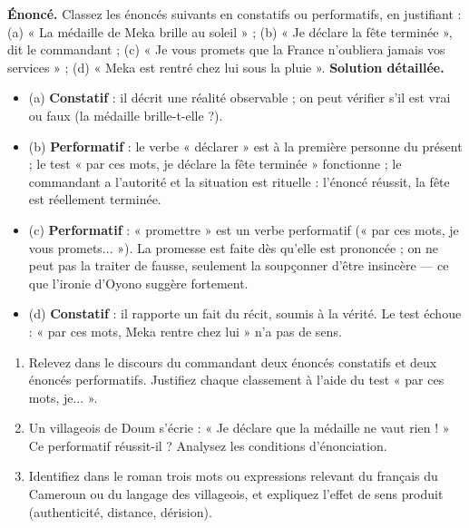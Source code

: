 \documentclass[11pt]{article}
\begin{document}
\begin{exoresolu}
\textbf{Énoncé.} Classez les énoncés suivants en constatifs ou performatifs, en justifiant : (a) « La médaille de Meka brille au soleil » ; (b) « Je déclare la fête terminée », dit le commandant ; (c) « Je vous promets que la France n'oubliera jamais vos services » ; (d) « Meka est rentré chez lui sous la pluie ».
\tcblower
\textbf{Solution détaillée.}
\begin{itemize}
\item (a) \textbf{Constatif} : il décrit une réalité observable ; on peut vérifier s'il est vrai ou faux (la médaille brille-t-elle ?).
\item (b) \textbf{Performatif} : le verbe « déclarer » est à la première personne du présent ; le test « par ces mots, je déclare la fête terminée » fonctionne ; le commandant a l'autorité et la situation est rituelle : l'énoncé réussit, la fête est réellement terminée.
\item (c) \textbf{Performatif} : « promettre » est un verbe performatif (« par ces mots, je vous promets... »). La promesse est faite dès qu'elle est prononcée ; on ne peut pas la traiter de fausse, seulement la soupçonner d'être insincère — ce que l'ironie d'Oyono suggère fortement.
\item (d) \textbf{Constatif} : il rapporte un fait du récit, soumis à la vérité. Le test échoue : « par ces mots, Meka rentre chez lui » n'a pas de sens.
\end{itemize}
\end{exoresolu}

\begin{exercice}
\begin{enumerate}
\item Relevez dans le discours du commandant deux énoncés constatifs et deux énoncés performatifs. Justifiez chaque classement à l'aide du test « par ces mots, je... ».
\item Un villageois de Doum s'écrie : « Je déclare que la médaille ne vaut rien ! » Ce performatif réussit-il ? Analysez les conditions d'énonciation.
\item Identifiez dans le roman trois mots ou expressions relevant du français du Cameroun ou du langage des villageois, et expliquez l'effet de sens produit (authenticité, distance, dérision).
\end{enumerate}
\end{exercice}
\end{document}
